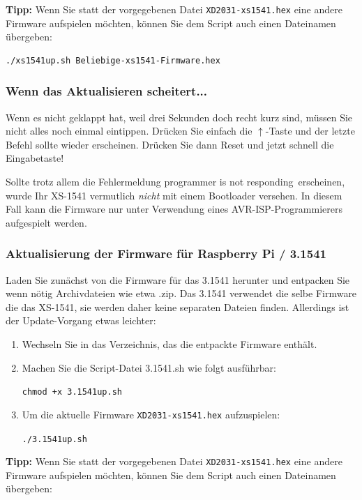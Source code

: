 \documentclass[10pt,a4paper]{scrartcl}		%
\begin{document}
\textbf{Tipp:} Wenn Sie statt der vorgegebenen Datei 
\texttt{XD2031-xs1541.hex}
eine andere Firmware aufspielen möchten, können Sie
dem Script auch einen Dateinamen übergeben:

\begin{verbatim}
./xs1541up.sh Beliebige-xs1541-Firmware.hex
\end{verbatim}

\subsubsection*{Wenn das Aktualisieren scheitert...}
Wenn es nicht geklappt hat, weil drei Sekunden doch recht kurz sind,
müssen Sie nicht alles noch einmal eintippen. Drücken Sie einfach
die $\uparrow$-Taste und der letzte Befehl sollte
wieder erscheinen. Drücken Sie dann Reset und jetzt schnell die Eingabetaste!

Sollte trotz allem die Fehlermeldung \glqq programmer is not responding\grqq\ 
erscheinen, wurde Ihr XS-1541 vermutlich \textit{nicht} mit einem Bootloader
versehen. In diesem Fall kann die Firmware nur unter Verwendung eines
AVR-ISP-Programmierers aufgespielt werden.



\subsubsection{Aktualisierung der Firmware für Raspberry Pi / 3.1541}
\label{fwinst31541}
Laden Sie zunächst von \fwbinaries{} die Firm\-ware für das 3.1541
herunter und entpacken Sie wenn nötig Archivdateien wie etwa \glqq .zip\grqq . 
Das 3.1541 verwendet die selbe Firmware die das XS-1541, sie werden daher
keine separaten Dateien finden. Allerdings ist der Update-Vorgang etwas
leichter:

\begin{enumerate}
\item Wechseln Sie in das Verzeichnis, das die entpackte Firmware enthält.
\item Machen Sie die Script-Datei 3.1541.sh wie folgt ausführbar:

\texttt{chmod +x 3.1541up.sh}
\item Um die aktuelle Firmware \texttt{XD2031-xs1541.hex} aufzuspielen:

	\texttt{./3.1541up.sh}
\end{enumerate}

\textbf{Tipp:} Wenn Sie statt der vorgegebenen Datei 
\texttt{XD2031-xs1541.hex}
eine andere Firmware aufspielen möchten, können Sie
dem Script auch einen Dateinamen übergeben:
\end{document}
